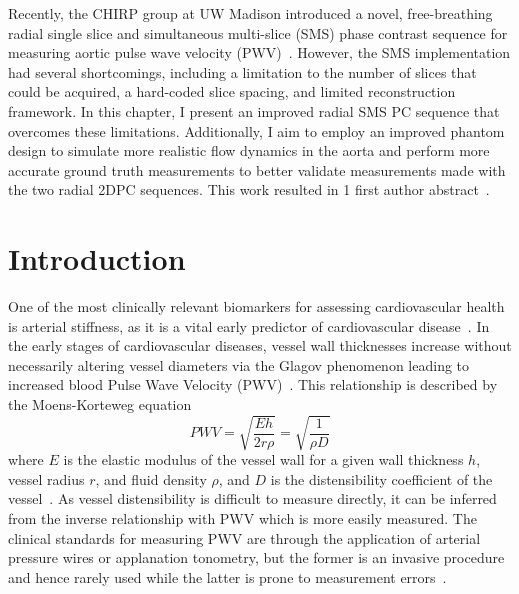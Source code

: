 Recently, the CHIRP group at UW Madison introduced a novel, free-breathing radial single slice and simultaneous multi-slice (SMS) phase contrast sequence for measuring aortic pulse wave velocity (PWV)~\cite{robertsAdvancingFunctionalAssessment2023}. However, the SMS implementation had several shortcomings, including a limitation to the number of slices that could be acquired, a hard-coded slice spacing, and limited reconstruction framework. In this chapter, I present an improved radial SMS PC sequence that overcomes these limitations. Additionally, I aim to employ an improved phantom design to simulate more realistic flow dynamics in the aorta and perform more accurate ground truth measurements to better validate measurements made with the two radial 2DPC sequences. This work resulted in 1 first author abstract~\cite{narenFeasibility}. 

\section{Introduction}\label{sec:phantom_intro}
One of the most clinically relevant biomarkers for assessing cardiovascular health is arterial stiffness, as it is a vital early predictor of cardiovascular disease~\cite{cavalcanteAorticStiffness2011}. In the early stages of cardiovascular diseases, vessel wall thicknesses increase without necessarily altering vessel diameters via the Glagov phenomenon leading to increased blood Pulse Wave Velocity (PWV)~\cite{wentlandReviewMRIbasedMeasurements2014}. This relationship is described by the Moens-Korteweg equation 
\begin{equation}
    PWV={\sqrt{\frac{E h}{2r\rho }}}=\sqrt{\frac{1}{\rho D}}
    \label{eq:moens-korteweg}
\end{equation}
where $E$ is the elastic modulus of the vessel wall for a given wall thickness $h$, vessel radius $r$, and fluid density $\rho$, and $D$ is the distensibility coefficient of the vessel~\cite{newmanValidityMoensKortewegEquation1978, callaghanRelationshipPulsewaveVelocity1986}. As vessel distensibility is difficult to measure directly, it can be inferred from the inverse relationship with PWV which is more easily measured. The clinical standards for measuring PWV are through the application of arterial pressure wires or applanation tonometry, but the former is an invasive procedure and hence rarely used while the latter is prone to measurement errors~\cite{avolioArterialBloodPressure2009,kimPulseWaveVelocity2019}. 

